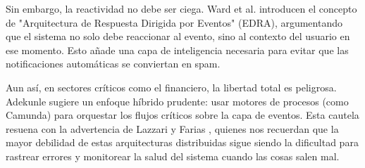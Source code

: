 Sin embargo, la reactividad no debe ser ciega. Ward et al. \cite{ward2005response} introducen el concepto de "Arquitectura de Respuesta Dirigida por Eventos" (EDRA), argumentando que el sistema no solo debe reaccionar al evento, sino al contexto del usuario en ese momento. Esto añade una capa de inteligencia necesaria para evitar que las notificaciones automáticas se conviertan en spam.

Aun así, en sectores críticos como el financiero, la libertad total es peligrosa. Adekunle \cite{adekunle2024financial} sugiere un enfoque híbrido prudente: usar motores de procesos (como Camunda) para orquestar los flujos críticos sobre la capa de eventos. Esta cautela resuena con la advertencia de Lazzari y Farias \cite{lazzari2023hidden}, quienes nos recuerdan que la mayor debilidad de estas arquitecturas distribuidas sigue siendo la dificultad para rastrear errores y monitorear la salud del sistema cuando las cosas salen mal.